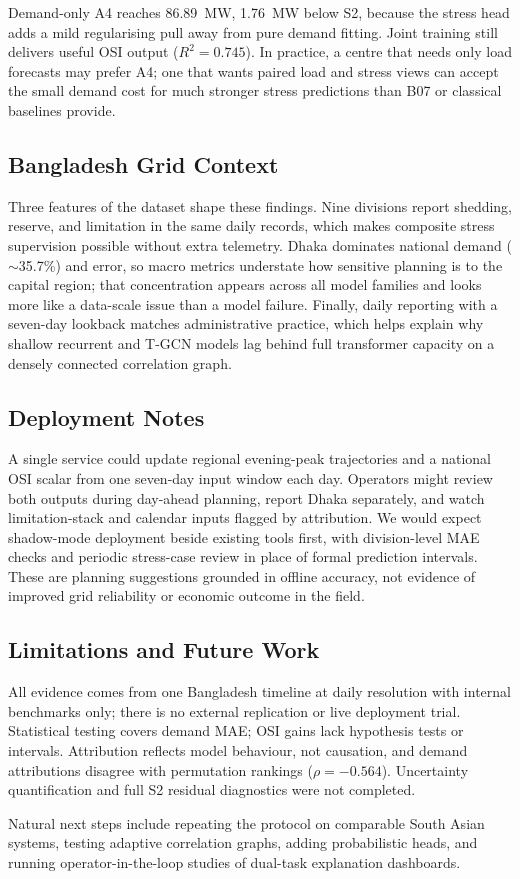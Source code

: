 Demand-only A4 reaches 86.89~MW, 1.76~MW below S2, because the stress head adds a mild regularising pull away from pure demand fitting. Joint training still delivers useful OSI output ($R^2{=}0.745$). In practice, a centre that needs only load forecasts may prefer A4; one that wants paired load and stress views can accept the small demand cost for much stronger stress predictions than B07 or classical baselines provide.

\subsection{Bangladesh Grid Context}

Three features of the dataset shape these findings. Nine divisions report shedding, reserve, and limitation in the same daily records, which makes composite stress supervision possible without extra telemetry. Dhaka dominates national demand ($\sim$35.7\%) and error, so macro metrics understate how sensitive planning is to the capital region; that concentration appears across all model families and looks more like a data-scale issue than a model failure. Finally, daily reporting with a seven-day lookback matches administrative practice, which helps explain why shallow recurrent and T-GCN models lag behind full transformer capacity on a densely connected correlation graph.

\subsection{Deployment Notes}

A single service could update regional evening-peak trajectories and a national OSI scalar from one seven-day input window each day. Operators might review both outputs during day-ahead planning, report Dhaka separately, and watch limitation-stack and calendar inputs flagged by attribution. We would expect shadow-mode deployment beside existing tools first, with division-level MAE checks and periodic stress-case review in place of formal prediction intervals. These are planning suggestions grounded in offline accuracy, not evidence of improved grid reliability or economic outcome in the field.

\subsection{Limitations and Future Work}

All evidence comes from one Bangladesh timeline at daily resolution with internal benchmarks only; there is no external replication or live deployment trial. Statistical testing covers demand MAE; OSI gains lack hypothesis tests or intervals. Attribution reflects model behaviour, not causation, and demand attributions disagree with permutation rankings ($\rho{=}{-}0.564$). Uncertainty quantification and full S2 residual diagnostics were not completed.

Natural next steps include repeating the protocol on comparable South Asian systems, testing adaptive correlation graphs, adding probabilistic heads, and running operator-in-the-loop studies of dual-task explanation dashboards.
